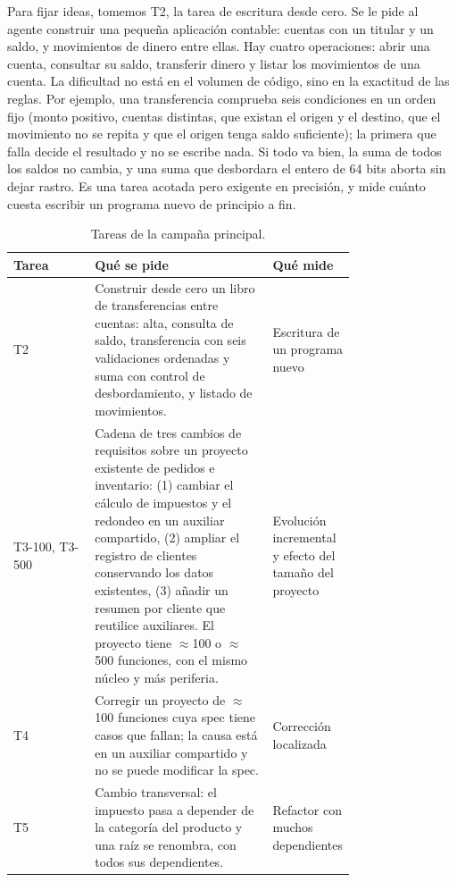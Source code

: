 \documentclass[11pt, a4paper]{article}
\begin{document}
Para fijar ideas, tomemos T2, la tarea de escritura desde cero. Se le pide al agente construir una pequeña aplicación contable: cuentas con un titular y un saldo, y movimientos de dinero entre ellas. Hay cuatro operaciones: abrir una cuenta, consultar su saldo, transferir dinero y listar los movimientos de una cuenta. La dificultad no está en el volumen de código, sino en la exactitud de las reglas. Por ejemplo, una transferencia comprueba seis condiciones en un orden fijo (monto positivo, cuentas distintas, que existan el origen y el destino, que el movimiento no se repita y que el origen tenga saldo suficiente); la primera que falla decide el resultado y no se escribe nada. Si todo va bien, la suma de todos los saldos no cambia, y una suma que desbordara el entero de 64 bits aborta sin dejar rastro. Es una tarea acotada pero exigente en precisión, y mide cuánto cuesta escribir un programa nuevo de principio a fin.

\begin{table}[h]
\centering
\small
\caption{Tareas de la campaña principal.}
\label{tab:tasks}
\begin{tabular}{@{}l p{0.52\linewidth} p{0.24\linewidth}@{}}
\toprule
Tarea & Qué se pide & Qué mide \\
\midrule
T2 & Construir desde cero un libro de transferencias entre cuentas: alta, consulta de saldo, transferencia con seis validaciones ordenadas y suma con control de desbordamiento, y listado de movimientos. & Escritura de un programa nuevo \\
T3-100, T3-500 & Cadena de tres cambios de requisitos sobre un proyecto existente de pedidos e inventario: (1) cambiar el cálculo de impuestos y el redondeo en un auxiliar compartido, (2) ampliar el registro de clientes conservando los datos existentes, (3) añadir un resumen por cliente que reutilice auxiliares. El proyecto tiene $\approx$100 o $\approx$500 funciones, con el mismo núcleo y más periferia. & Evolución incremental y efecto del tamaño del proyecto \\
T4 & Corregir un proyecto de $\approx$100 funciones cuya spec tiene casos que fallan; la causa está en un auxiliar compartido y no se puede modificar la spec. & Corrección localizada \\
T5 & Cambio transversal: el impuesto pasa a depender de la categoría del producto y una raíz se renombra, con todos sus dependientes. & Refactor con muchos dependientes \\
\bottomrule
\end{tabular}
\end{table}
\end{document}
